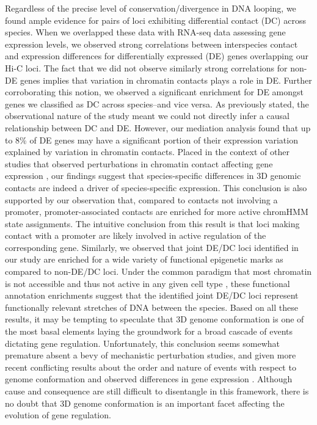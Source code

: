 Regardless of the precise level of conservation/divergence in DNA looping, we found ample evidence for pairs of loci exhibiting differential contact (DC) across species. When we overlapped these data with RNA-seq data assessing gene expression levels, we observed strong correlations between interspecies contact and expression differences for differentially expressed (DE) genes overlapping our Hi-C loci. The fact that we did not observe similarly strong correlations for non-DE genes implies that variation in chromatin contacts plays a role in DE. Further corroborating this notion, we observed a significant enrichment for DE amongst genes we classified as DC across species--and vice versa. As previously stated, the observational nature of the study meant we could not directly infer a causal relationship between DC and DE. However, our mediation analysis found that up to 8\% of DE genes may have a significant portion of their expression variation explained by variation in chromatin contacts. Placed in the context of other studies that observed perturbations in chromatin contact affecting gene expression \cite{Lupiáñez.2015, Siersbæk.2017}, our findings suggest that species-specific differences in 3D genomic contacts are indeed a driver of species-specific expression. This conclusion is also supported by our observation that, compared to contacts not involving a promoter, promoter-associated contacts are enriched for more active chromHMM state assignments. The intuitive conclusion from this result is that loci making contact with a promoter are likely involved in active regulation of the corresponding gene. Similarly, we observed that joint DE/DC loci identified in our study are enriched for a wide variety of functional epigenetic marks as compared to non-DE/DC loci. Under the common paradigm that most chromatin is not accessible and thus not active in any given cell type \cite{Thurman.2012}, these functional annotation enrichments suggest that the identified joint DE/DC loci represent functionally relevant stretches of DNA between the species. Based on all these results, it may be tempting to speculate that 3D genome conformation is one of the most basal elements laying the groundwork for a broad cascade of events dictating gene regulation. Unfortunately, this conclusion seems somewhat premature absent a bevy of mechanistic perturbation studies, and given more recent conflicting results about the order and nature of events with respect to genome conformation and observed differences in gene expression \cite{Jiang.2020, Ghavi-Helm.2019, Espinola.2020, Ing-Simmons.2020, Alexander.2019, Benabdallah.2019}. Although cause and consequence are still difficult to disentangle in this framework, there is no doubt that 3D genome conformation is an important facet affecting the evolution of gene regulation. 

